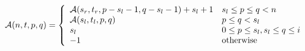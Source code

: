 \begin{equation}  \label{fun:LCA}
    {\cal A}(n, t, p, q) =
    \left\{
    \begin{array}{ll}
      {\cal A}(s_r, t_r, p - s_l - 1, q - s_l - 1) + s_l + 1 & s_l \le p \le q < n\\
      {\cal A}(s_l, t_l, p, q) & p \le q < s_l\\
      s_l & 0 \le p \le s_l, s_l \le q \le i\\
      -1 & \mbox{otherwise} \\
    \end{array}
    \right.
\end{equation}

